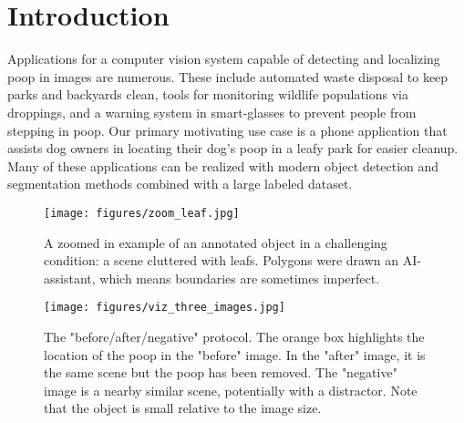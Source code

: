 \documentclass[10pt,twocolumn,letterpaper]{article}
\begin{document}
\section{Introduction}
\label{sec:intro}

Applications for a computer vision system capable of detecting and localizing poop in images are numerous.
These include automated waste disposal to keep parks and backyards clean, tools for monitoring wildlife
  populations via droppings, and a warning system in smart-glasses to prevent people from stepping in poop.
Our primary motivating use case is a phone application that assists dog owners in locating their dog's poop
  in a leafy park for easier cleanup.
Many of these applications can be realized with modern object detection and segmentation methods
  \cite{sandler_mobilenetv2_2018, siam_rtseg_2018, yu_mobilenet_yolo_2023} combined with a large labeled
  dataset.

\begin{figure}[ht]
\centering
\texttt{[image: figures/zoom\_leaf.jpg]}
\caption[]{
    A zoomed in example of an annotated object in a challenging
    condition: a scene cluttered with leafs. Polygons were drawn an AI-assistant,
    which means boundaries are sometimes imperfect.
}
\label{fig:HardCase}
\end{figure}

\begin{figure}[ht]
\centering
\texttt{[image: figures/viz\_three\_images.jpg]}
\caption[]{
The "before/after/negative" protocol.
The orange box highlights the location of the poop 
in the "before" image.
In the "after" image, it is the same scene but the poop has been removed.
The "negative" image is a nearby similar scene, potentially with a distractor.
Note that the object is small relative to the image size.}
\label{fig:ThreeImages}
\end{figure}
\end{document}
